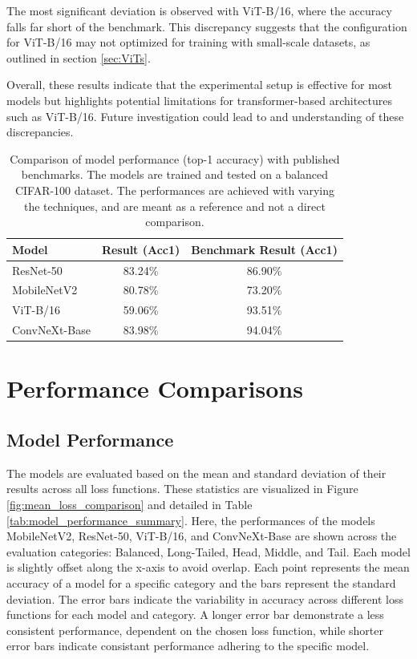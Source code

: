 The most significant deviation is observed with ViT-B/16, where the accuracy falls far short of the benchmark. This discrepancy suggests that the configuration for ViT-B/16 may not optimized for training with small-scale datasets, as outlined in section \ref{sec:ViTs}. 

Overall, these results indicate that the experimental setup is effective for most models but highlights potential limitations for transformer-based architectures such as ViT-B/16. Future investigation could lead to and understanding of these discrepancies.

\begin{table}[H]
    \centering
    \caption{Comparison of model performance (top-1 accuracy) with published benchmarks. The models are trained and tested on a balanced CIFAR-100 dataset. The performances are achieved with varying the techniques, and are meant as a reference and not a direct comparison.}
    \small
    \begin{tabular}{lcc}
    \toprule
    \textbf{Model}        & \textbf{Result (Acc1)} & \textbf{Benchmark Result (Acc1)}  \\ 
    \midrule
    ResNet-50            & 83.24\%               & 86.90\% \cite{wightman2021resnetstrikesbackimproved}  \\ 
    MobileNetV2           & 80.78\%               & 73.20\% \cite{park2022bitatneuralnetworkbinarization}  \\ 
    ViT-B/16              & 59.06\%               & 93.51\% \cite{ye2023partialfinetuningsuccessorfinetuning} \\ 
    ConvNeXt-Base         & 83.98\%               & 94.04\% \cite{ye2023partialfinetuningsuccessorfinetuning}  \\ 
    \bottomrule
    \end{tabular}
    \label{tab:benchmark_comparison}
\end{table}



\section{Performance Comparisons}
\subsection{Model Performance}
The models are evaluated based on the mean and standard deviation of their results across all loss functions. These statistics are visualized in Figure \ref{fig:mean_loss_comparison} and detailed in Table \ref{tab:model_performance_summary}. Here, the performances of the models MobileNetV2, ResNet-50, ViT-B/16, and ConvNeXt-Base are shown across the evaluation categories: Balanced, Long-Tailed, Head, Middle, and Tail. Each model is slightly offset along the x-axis to avoid overlap. Each point represents the mean accuracy of a model for a specific category and the bars represent the standard deviation. The error bars indicate the variability in accuracy across different loss functions for each model and category. A longer error bar demonstrate a less consistent performance, dependent on the chosen loss function, while shorter error bars indicate consistant performance adhering to the specific model.

